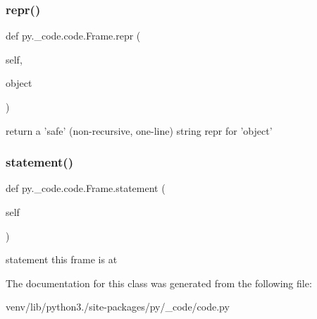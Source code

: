 \subsubsection{\texorpdfstring{repr()}{repr()}}
{\footnotesize\ttfamily def py.\+\_\+code.\+code.\+Frame.\+repr (\begin{DoxyParamCaption}\item[{}]{self,  }\item[{}]{object }\end{DoxyParamCaption})}

\begin{DoxyVerb}return a 'safe' (non-recursive, one-line) string repr for 'object'
\end{DoxyVerb}
 \mbox{\label{classpy_1_1__code_1_1code_1_1_frame_a94ebaef23b91092b348a7bcf56098fe7}} 
\subsubsection{\texorpdfstring{statement()}{statement()}}
{\footnotesize\ttfamily def py.\+\_\+code.\+code.\+Frame.\+statement (\begin{DoxyParamCaption}\item[{}]{self }\end{DoxyParamCaption})}

\begin{DoxyVerb}statement this frame is at \end{DoxyVerb}
 

The documentation for this class was generated from the following file\+:\begin{DoxyCompactItemize}
\item 
venv/lib/python3./site-\/packages/py/\+\_\+code/code.\+py\end{DoxyCompactItemize}
